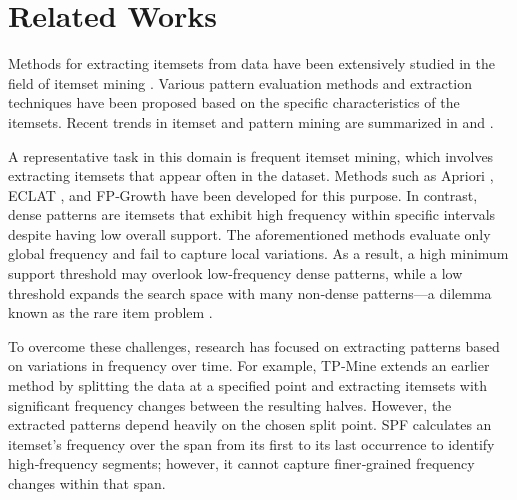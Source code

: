 \section{Related Works}
\label{related_works}

Methods for extracting itemsets from data have been extensively studied in the field of itemset mining \cite{fournier2017survey}. Various pattern evaluation methods and extraction techniques have been proposed based on the specific characteristics of the itemsets. Recent trends in itemset and pattern mining are summarized in \cite{fournier2022pattern} and \cite{fournier2019survey}.

A representative task in this domain is frequent itemset mining, which involves extracting itemsets that appear often in the dataset. Methods such as Apriori \cite{agrawal1994fast}, ECLAT \cite{zaki1997new}, and FP‑Growth \cite{han2000mining} have been developed for this purpose. In contrast, dense patterns are itemsets that exhibit high frequency within specific intervals despite having low overall support. The aforementioned methods evaluate only global frequency and fail to capture local variations. As a result, a high minimum support threshold may overlook low‑frequency dense patterns, while a low threshold expands the search space with many non‑dense patterns—a dilemma known as the rare item problem \cite{liu1999mining}.

To overcome these challenges, research has focused on extracting patterns based on variations in frequency over time. For example, TP‑Mine \cite{wan2009discovering} extends an earlier method \cite{dong1999efficient} by splitting the data at a specified point and extracting itemsets with significant frequency changes between the resulting halves. However, the extracted patterns depend heavily on the chosen split point. SPF \cite{chang2002mining} calculates an itemset’s frequency over the span from its first to its last occurrence to identify high‑frequency segments; however, it cannot capture finer‑grained frequency changes within that span.

